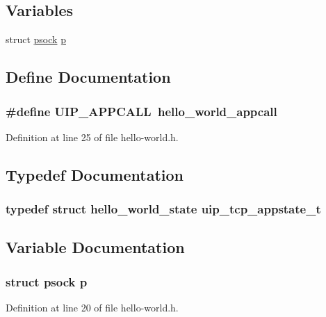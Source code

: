 \subsection*{Variables}
\begin{DoxyCompactItemize}
\item 
struct \hyperlink{structpsock}{psock} \hyperlink{socket__exemplos_2hello-world_8h_a245c0f47e726cb7b4c2fbe797657505d}{p}
\end{DoxyCompactItemize}


\subsection{Define Documentation}
\hypertarget{socket__exemplos_2hello-world_8h_ae28f6cb60e86088d8886d0f804b4f37c}{
\subsubsection[{UIP\_\-APPCALL}]{\setlength{\rightskip}{0pt plus 5cm}\#define UIP\_\-APPCALL~hello\_\-world\_\-appcall}}
\label{socket__exemplos_2hello-world_8h_ae28f6cb60e86088d8886d0f804b4f37c}


Definition at line 25 of file hello-\/world.h.



\subsection{Typedef Documentation}
\hypertarget{socket__exemplos_2hello-world_8h_a59fa408ba4e2508c633c2484aafae8a1}{
\subsubsection[{uip\_\-tcp\_\-appstate\_\-t}]{\setlength{\rightskip}{0pt plus 5cm}typedef struct {\bf hello\_\-world\_\-state}  {\bf uip\_\-tcp\_\-appstate\_\-t}}}
\label{socket__exemplos_2hello-world_8h_a59fa408ba4e2508c633c2484aafae8a1}


\subsection{Variable Documentation}
\hypertarget{socket__exemplos_2hello-world_8h_a245c0f47e726cb7b4c2fbe797657505d}{
\subsubsection[{p}]{\setlength{\rightskip}{0pt plus 5cm}struct {\bf psock} {\bf p}}}
\label{socket__exemplos_2hello-world_8h_a245c0f47e726cb7b4c2fbe797657505d}


Definition at line 20 of file hello-\/world.h.

